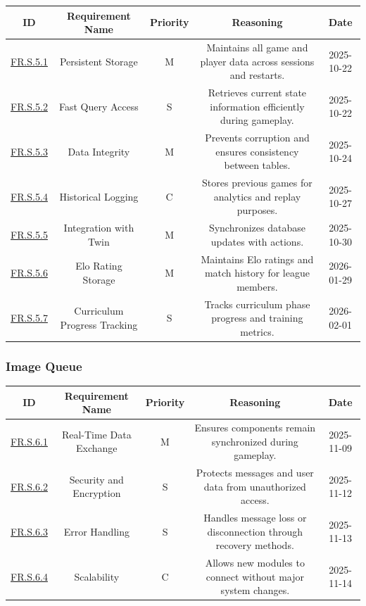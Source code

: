 \documentclass{article}
\begin{document}
\begin{tabular}{|c|c|c|c|c|}
\hline
\textbf{ID} & \textbf{Requirement Name} & \textbf{Priority} &
\textbf{Reasoning} & \textbf{Date} \\
\hline
\hyperref[FR.S.5.1]{FR.S.5.1} & Persistent Storage & M &
\parbox[t]{4cm}{Maintains all game and player data across sessions
and restarts.} &
2025-10-22 \\
\hline
\hyperref[FR.S.5.2]{FR.S.5.2} & Fast Query Access & S &
\parbox[t]{4cm}{Retrieves current state information efficiently
during gameplay.} &
2025-10-22 \\
\hline
\hyperref[FR.S.5.3]{FR.S.5.3} & Data Integrity & M &
\parbox[t]{4cm}{Prevents corruption and ensures consistency between
tables.} &
2025-10-24 \\
\hline
\hyperref[FR.S.5.4]{FR.S.5.4} & Historical Logging & C &
\parbox[t]{4cm}{Stores previous games for analytics and replay
purposes.} &
2025-10-27 \\
\hline
\hyperref[FR.S.5.5]{FR.S.5.5} & Integration with Twin & M &
\parbox[t]{4cm}{Synchronizes database updates with \DigitalTwin{}
actions.} &
2025-10-30 \\
\hline
\hyperref[FR.S.5.6]{FR.S.5.6} & Elo Rating Storage & M &
\parbox[t]{4cm}{Maintains Elo ratings and match history for league members.} &
2026-01-29 \\
\hline
\hyperref[FR.S.5.7]{FR.S.5.7} & Curriculum Progress Tracking & S &
\parbox[t]{4cm}{Tracks curriculum phase progress and training metrics.} &
2026-02-01 \\
\hline
\end{tabular}

\vspace{1em}

\subsubsection*{Image Queue}

\begin{tabular}{|c|c|c|c|c|}
\hline
\textbf{ID} & \textbf{Requirement Name} & \textbf{Priority} &
\textbf{Reasoning} & \textbf{Date} \\
\hline
\hyperref[FR.S.6.1]{FR.S.6.1} & Real-Time Data Exchange & M &
\parbox[t]{4cm}{Ensures components remain synchronized during
gameplay.} &
2025-11-09 \\
\hline
\hyperref[FR.S.6.2]{FR.S.6.2} & Security and Encryption & S &
\parbox[t]{4cm}{Protects messages and user data from unauthorized
access.} &
2025-11-12 \\
\hline
\hyperref[FR.S.6.3]{FR.S.6.3} & Error Handling & S &
\parbox[t]{4cm}{Handles message loss or disconnection through
recovery methods.} &
2025-11-13 \\
\hline
\hyperref[FR.S.6.4]{FR.S.6.4} & Scalability & C &
\parbox[t]{4cm}{Allows new modules to connect without major system
changes.} &
2025-11-14 \\
\hline
\end{tabular}
\end{document}
